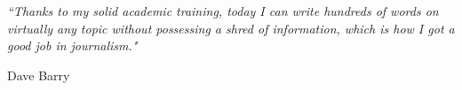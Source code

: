 \documentclass[11pt, a4paper, oneside]{Thesis} %
\title{\ttitle} %
\begin{document}
\frontmatter %


\fancyhead{} %
\rhead{\thepage} %
\lhead{} %

\pagestyle{fancy} %

\newcommand{\HRule}{\rule{\linewidth}{0.5mm}} %

\hypersetup{pdfsubject=\subjectname}
\hypersetup{pdfauthor=\authornames}
\hypersetup{pdfkeywords=\keywordnames}
\newcommand{\ra}[1]{\renewcommand{\arraystretch}{#1}}


\pagestyle{empty} %

\null\vfill %

\textit{``Thanks to my solid academic training, today I can write hundreds of words on virtually any topic without possessing a shred of information, which is how I got a good job in journalism."}

\begin{flushright}
Dave Barry
\end{flushright}

\vfill\vfill\vfill\vfill\vfill\vfill\null %

\clearpage %



\clearpage %
\end{document}
